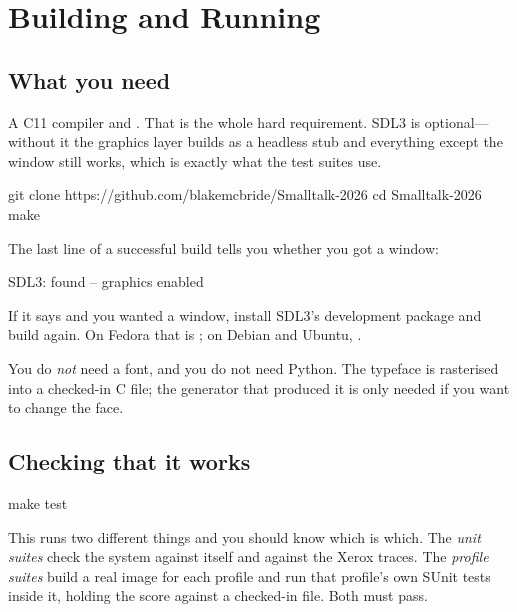 \chapter{Building and Running}
\label{ch:building}


\section{What you need}

A C11 compiler and . That is the whole hard requirement. SDL3 is
optional---without it the graphics layer builds as a headless stub and
everything except the window still works, which is exactly what the test
suites use.

\begin{sh}
git clone https://github.com/blakemcbride/Smalltalk-2026
cd Smalltalk-2026
make
\end{sh}

The last line of a successful build tells you whether you got a window:

\begin{plain}
SDL3: found -- graphics enabled
\end{plain}

If it says  and you wanted a window, install
SDL3's development package and build again. On Fedora that is
; on Debian and Ubuntu, .

You do \emph{not} need a font, and you do not need Python. The typeface is
rasterised into a checked-in C file; the generator that produced it is only
needed if you want to change the face.

\section{Checking that it works}

\begin{sh}
make test
\end{sh}

This runs two different things and you should know which is which. The
\emph{unit suites} check the system against itself and against the Xerox
traces. The \emph{profile suites} build a real image for each profile and run
that profile's own SUnit tests inside it, holding the score against a
checked-in file. Both must pass.

